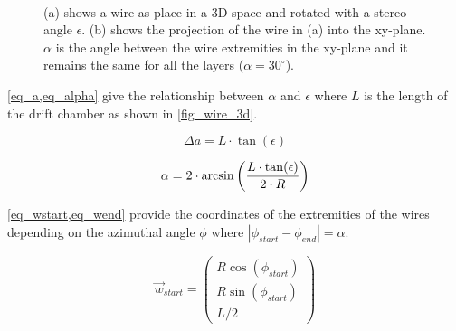 \begin{figure}[ht]
\begin{subfigure}[b]{0.49\textwidth}
     \caption{}
     \label{fig_wire_2d}
  \end{subfigure}~
	\caption{(a) shows a wire as place in a 3D space and rotated with a stereo angle $\epsilon$. (b) shows the projection of the wire in (a) into the xy-plane. $\alpha$ is the angle between the wire extremities in the xy-plane and it remains the same for all the layers ($\alpha = 30^{\circ}$).}
	\label{wires_dch}
\end{figure}

\cref{eq_a,eq_alpha} give the relationship between $\alpha$ and $\epsilon$ where $L$ is the length of the drift chamber as shown in \cref{fig_wire_3d}.



\begin{equation}
  \Delta a = L \cdot \tan(\epsilon)
  \label{eq_a}
\end{equation}


\begin{equation}
  \alpha = 2 \cdot \arcsin\left({{L \cdot \tan(\epsilon)} \over {2
        \cdot R}}\right)
    \label{eq_alpha}
\end{equation}

\cref{eq_wstart,eq_wend} provide the coordinates of the extremities of the wires depending on the azimuthal angle $\phi$ where $\left|\phi_{start}-\phi_{end}\right| = \alpha$.

\begin{equation}
  \vec{w}_{start} = \begin{pmatrix}
    R \cos(\phi_{start}) \\
    R \sin(\phi_{start}) \\
    L/2
  \end{pmatrix}
  \label{eq_wstart}
\end{equation}

